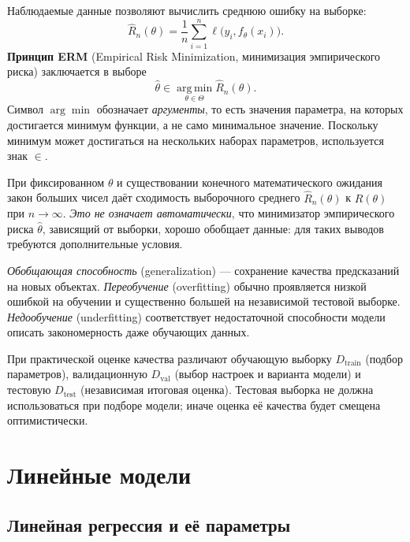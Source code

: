 \documentclass[12pt,a4paper]{article}
\begin{document}
Наблюдаемые данные позволяют вычислить среднюю ошибку на выборке:
\begin{equation}
    \widehat R_n(\theta)=\frac1n\sum_{i=1}^{n}
    \ell\bigl(y_i,f_\theta(x_i)\bigr).
    \label{eq:empirical-risk}
\end{equation}
\textbf{Принцип ERM} (Empirical Risk Minimization, минимизация
эмпирического риска) заключается в выборе
\begin{equation}
    \hat\theta\in\operatorname*{arg\,min}_{\theta\in\Theta}
    \widehat R_n(\theta).
    \label{eq:erm}
\end{equation}
Символ $\arg\min$ обозначает \emph{аргументы}, то есть значения параметра,
на которых достигается минимум функции, а не само минимальное значение.
Поскольку минимум может достигаться на нескольких наборах параметров,
используется знак $\in$.

При фиксированном $\theta$ и существовании конечного математического
ожидания закон больших чисел даёт сходимость выборочного среднего
$\widehat R_n(\theta)$ к $R(\theta)$ при $n\to\infty$.
\emph{Это не означает автоматически}, что минимизатор эмпирического
риска $\hat\theta$, зависящий от выборки, хорошо обобщает данные:
для таких выводов требуются дополнительные условия.

\emph{Обобщающая способность} (generalization) --- сохранение качества
предсказаний на новых объектах. \emph{Переобучение} (overfitting)
обычно проявляется низкой ошибкой на обучении и существенно большей
на независимой тестовой выборке. \emph{Недообучение} (underfitting)
соответствует недостаточной способности модели описать закономерность
даже обучающих данных.

При практической оценке качества различают обучающую выборку
$D_{\mathrm{train}}$ (подбор параметров), валидационную
$D_{\mathrm{val}}$ (выбор настроек и варианта модели) и тестовую
$D_{\mathrm{test}}$ (независимая итоговая оценка).
Тестовая выборка не должна использоваться при подборе модели;
иначе оценка её качества будет смещена оптимистически.

\section{Линейные модели}

\subsection{Линейная регрессия и её параметры}
\end{document}
